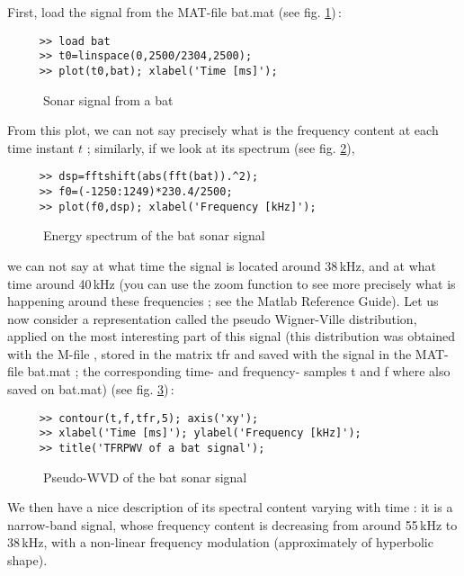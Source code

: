   First, load the signal from the MAT-file {\ttfamily bat.mat} (see
fig. \ref{In2fig7})\,: 
\begin{verbatim}
     >> load bat
     >> t0=linspace(0,2500/2304,2500);   
     >> plot(t0,bat); xlabel('Time [ms]');
\end{verbatim}
\begin{figure}[htb]
\epsfxsize=10cm
\epsfysize=6cm
\centerline{}
\caption{\label{In2fig7}Sonar signal from a bat}
\end{figure}
From this plot, we can not say precisely what is the frequency content at
each time instant $t$ ; similarly, if we look at its spectrum (see
fig. \ref{In2fig8}), 
\begin{verbatim}
     >> dsp=fftshift(abs(fft(bat)).^2);
     >> f0=(-1250:1249)*230.4/2500;
     >> plot(f0,dsp); xlabel('Frequency [kHz]');
\end{verbatim}
\begin{figure}[htb]
\epsfxsize=10cm
\epsfysize=6cm
\centerline{}
\caption{\label{In2fig8}Energy spectrum of the bat sonar signal}
\end{figure}
we can not say at what time the signal is located around 38\,kHz, and at
what time around 40\,kHz (you can use the zoom function to see more
precisely what is happening around these frequencies ; see the Matlab
Reference Guide). Let us now consider a representation called the pseudo
Wigner-Ville distribution, applied on the most interesting part of this
signal (this distribution was obtained with the M-file , stored in the matrix {\ttfamily tfr} and saved
with the signal in the MAT-file {\ttfamily bat.mat} ; the corresponding
time- and frequency- samples {\ttfamily t} and {\ttfamily f} where also
saved on {\ttfamily bat.mat}) (see fig. \ref{In2fig9})\,:
\begin{verbatim}
     >> contour(t,f,tfr,5); axis('xy'); 
     >> xlabel('Time [ms]'); ylabel('Frequency [kHz]'); 
     >> title('TFRPWV of a bat signal');  
\end{verbatim}
\begin{figure}[htb]
\epsfxsize=10cm
\epsfysize=8cm
\centerline{}
\caption{\label{In2fig9}Pseudo-WVD of the bat sonar signal}
\end{figure}
We then have a nice description of its spectral content varying with time :
it is a narrow-band signal, whose frequency content is decreasing from
around 55\,kHz to 38\,kHz, with a non-linear frequency modulation
(approximately of hyperbolic shape).

